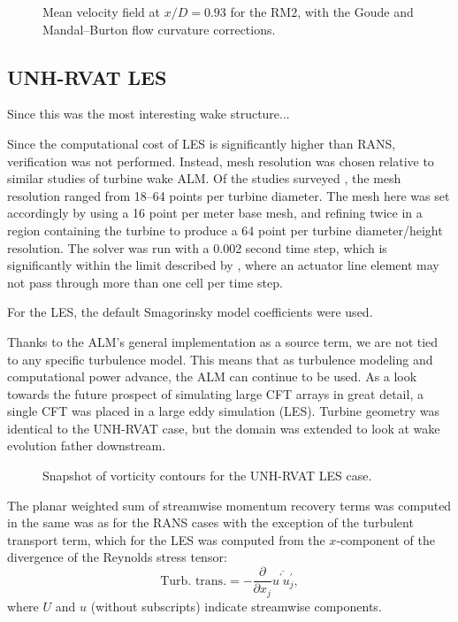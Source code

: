 \begin{figure}
    \caption{Mean velocity field at $x/D=0.93$ for the RM2, with the Goude and
        Mandal--Burton flow curvature corrections.}
    
    \label{fig:RM2-ALM-flow-curvature}
\end{figure}


\subsection{UNH-RVAT LES}

Since this was the most interesting wake structure...

Since the computational cost of LES is significantly higher than RANS,
verification was not performed. Instead, mesh resolution was chosen relative to
similar studies of turbine wake ALM. Of the studies surveyed
\cite{Shamsoddin2014,Archer2013,Martinez-Tossas2015a,Troldborg2007}, the mesh
resolution ranged from 18--64 points per turbine diameter. The mesh here was set
accordingly by using a 16 point per meter base mesh, and refining twice in a
region containing the turbine to produce a 64 point per turbine diameter/height
resolution. The solver was run with a 0.002 second time step, which is
significantly within the limit described by \cite{Martinez-Tossas2015}, where an
actuator line element may not pass through more than one cell per time step.

For the LES, the default Smagorinsky model coefficients were used. 

Thanks to the ALM's general implementation as a source term, we are not tied to
any specific turbulence model. This means that as turbulence modeling and
computational power advance, the ALM can continue to be used. As a look towards
the future prospect of simulating large CFT arrays in great detail, a single CFT
was placed in a large eddy simulation (LES). Turbine geometry was identical to
the UNH-RVAT case, but the domain was extended to look at wake evolution father
downstream.

\begin{figure}
    \caption{Snapshot of vorticity contours for the UNH-RVAT LES case.}
    
    \label{RVAT-LES}
\end{figure}



The planar weighted sum of streamwise momentum recovery terms was computed in
the same was as for the RANS cases with the exception of the turbulent transport
term, which for the LES was computed from the $x$-component of the divergence of
the Reynolds stress tensor:
\begin{equation}
    \text{Turb. trans.} = -\frac{\partial}{\partial x_j}
    \overline{u^\prime u^\prime_j},
\end{equation}
where $U$ and $u$ (without subscripts) indicate streamwise components.


